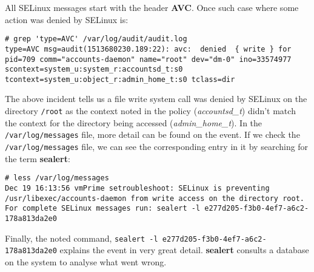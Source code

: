 \noindent
All SELinux messages start with the header \textbf{AVC}. Once such case where some action was denied by SELinux is:

\vspace{-15pt}
\begin{verbatim}
# grep 'type=AVC' /var/log/audit/audit.log
type=AVC msg=audit(1513680230.189:22): avc:  denied  { write } for  pid=709 comm="accounts-daemon" name="root" dev="dm-0" ino=33574977 scontext=system_u:system_r:accountsd_t:s0 tcontext=system_u:object_r:admin_home_t:s0 tclass=dir
\end{verbatim}
\vspace{-10pt}

\noindent
The above incident tells us a file write system call was denied by SELinux on the directory \verb|/root| as the context noted in the policy (\textit{accountsd\_t}) didn't match the  context for the directory being accessed (\textit{admin\_home\_t}). In the \verb|/var/log/messages| file, more detail can be found on the event. If we check the \verb|/var/log/messages| file, we can see the corresponding entry in it by searching for the term \textbf{sealert}:

\vspace{-15pt}
\begin{verbatim}
# less /var/log/messages
Dec 19 16:13:56 vmPrime setroubleshoot: SELinux is preventing /usr/libexec/accounts-daemon from write access on the directory root. For complete SELinux messages run: sealert -l e277d205-f3b0-4ef7-a6c2-178a813da2e0
\end{verbatim}
\vspace{-10pt}

\noindent
Finally, the noted command, \verb|sealert -l e277d205-f3b0-4ef7-a6c2-178a813da2e0| explains the event in very great detail. \textbf{sealert} consults a database on the system to analyse what went wrong. 

